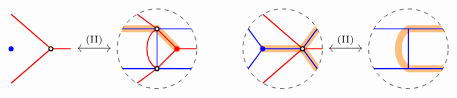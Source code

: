 \begin{figure}[ht]
\[\begin{tikzcd}[row sep=0pc]
\begin{tikzpicture}[baseline=-.5ex]
\draw [red, thick] (-1/2,{sqrt(3)/2}) -- (1/2,0)--(1,0);
\draw [red, thick] (-1/2,{-sqrt(3)/2}) -- (1/2,0);

\draw[thick,blue,fill=blue] (-1/2,0) circle (0.05);
\draw[thick,black,fill=white] (1/2,0) circle (0.05);
\end{tikzpicture}
\arrow[leftrightarrow,r,"\Move{II}"]&
\begin{tikzpicture}[baseline=-.5ex]
\draw [dashed] (3,0) circle [radius=1];%
\clip (3,0) circle (1);
\draw [color=cyclecolor1, line cap=round, line width=5, opacity=0.5] ({3-sqrt(3)/2},1/2)--(3,1/2)--(3.5,0);
\draw [blue, thick] ({3-sqrt(3)/2},1/2)--({3+sqrt(3)/2},1/2);
\draw [blue, thick] ({3-sqrt(3)/2},-1/2)--({3+sqrt(3)/2},-1/2);
\draw [blue, thick] (3,1/2)--(3,-1/2);

\draw [red, thick] (5/2,{sqrt(3)/2})--(3,1/2) to[out=-150,in=150] (3,-1/2)--(5/2,{-sqrt(3)/2});
\draw [red, thick] (3,1/2)--(7/2,0) -- (4,0);
\draw [red, thick] (3,-1/2)--(7/2,0);

\draw[thick,black,fill=white] (3,1/2) circle (0.05);
\draw[thick,black,fill=white] (3,-1/2) circle (0.05);
\draw[thick,red,fill=red] (7/2,0) circle (0.05);
\end{tikzpicture}
&
\begin{tikzpicture}[baseline=-.5ex]
\draw [dashed] (0,0) circle [radius=1];%
\clip (0,0) circle (1);
\draw [color=cyclecolor1, line cap=round, line width=5, opacity=0.5] ({sqrt(3)/2},1/2) -- (1/2,0)--({sqrt(3)/2},-1/2);
\draw [color=cyclecolor1, line cap=round, line width=5, opacity=0.5] (-1/2,0) -- (1/2,0);
\draw [blue, thick] ({-sqrt(3)/2},1/2)--(-1/2,0);
\draw [blue, thick] ({-sqrt(3)/2},-1/2)--(-1/2,0);
\draw [blue, thick] ({sqrt(3)/2},1/2)--(1/2,0);
\draw [blue, thick] ({sqrt(3)/2},-1/2)--(1/2,0);
\draw [blue, thick] (-1/2,0)--(1/2,0);

\draw [red, thick] (-1/2,{sqrt(3)/2}) -- (1/2,0)--(1,0);
\draw [red, thick] (-1/2,{-sqrt(3)/2}) -- (1/2,0);

\draw[thick,blue,fill=blue] (-1/2,0) circle (0.05);
\draw[thick,black,fill=white] (1/2,0) circle (0.05);
\end{tikzpicture}
\arrow[leftrightarrow,r,"\Move{II}"]&
\begin{tikzpicture}[baseline=-.5ex]
\draw [dashed] (3,0) circle [radius=1];%
\clip (3,0) circle (1);
\draw [color=cyclecolor1, line cap=round, line width=5, opacity=0.5] ({3+sqrt(3)/2},1/2)--(3,1/2) to[out=-150,in=150] (3,-1/2)--({3+sqrt(3)/2},-1/2);
\draw [blue, thick] ({3-sqrt(3)/2},1/2)--({3+sqrt(3)/2},1/2);
\draw [blue, thick] ({3-sqrt(3)/2},-1/2)--({3+sqrt(3)/2},-1/2);
\draw [blue, thick] (3,1/2)--(3,-1/2);


\end{tikzpicture}
\end{tikzcd}\]
\end{figure}
